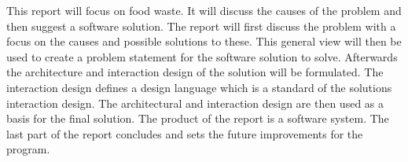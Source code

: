 This report will focus on food waste. It will discuss the causes of the problem and then suggest a software solution. The report will first discuss the problem with a focus on the causes and possible solutions to these. This general view will then be used to create a problem statement for the software solution to solve. Afterwards the architecture and interaction design of the solution will be formulated. The interaction design defines a design language which is a standard of the solutions interaction design. The architectural and interaction design are then used as a basis for the final solution. The product of the report is a software system. The last part of the report concludes and sets the future improvements for the program.